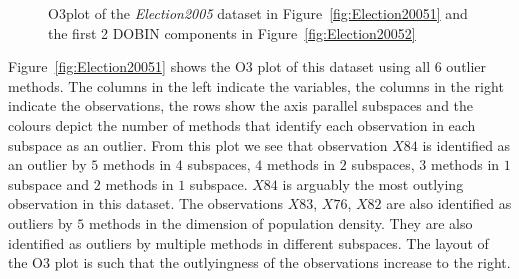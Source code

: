 \documentclass[11pt]{article}
\begin{document}
\begin{figure}
	\centering
	\caption{O3plot of the \textit{Election2005} dataset in Figure~\ref{fig:Election20051} and the first 2 DOBIN components in Figure~\ref{fig:Election20052} }
	\label{fig:Election2005}
\end{figure}

Figure~\ref{fig:Election20051} shows the O3 plot of this dataset using all $6$ outlier methods. The columns in the left indicate the variables, the columns in the right indicate the observations, the rows show the axis parallel subspaces and the colours depict the number of methods that identify each observation in each subspace as an outlier. From this plot we see that observation $X84$ is identified as an outlier by $5$ methods in $4$ subspaces, $4$ methods in $2$ subspaces, $3$ methods in $1$ subspace and $2$ methods in $1$ subspace. $X84$ is arguably the most outlying observation in this dataset. The observations $X83$, $X76$, $X82$ are also identified as outliers by $5$ methods in the dimension of population density. They are also identified as outliers by multiple methods in different subspaces. The layout of the O3 plot is such that the outlyingness of the observations increase to the right. \\
\end{document}
